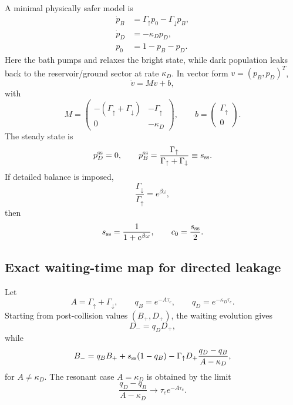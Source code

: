 \documentclass[11pt,a4paper]{article}
\begin{document}
A minimal physically safer model is
\begin{align}
\dot p_B&=\Gamma_\uparrow p_0-\Gamma_\downarrow p_B,\\
\dot p_D&=-\kappa_D p_D,\\
p_0&=1-p_B-p_D.
\end{align}
Here the bath pumps and relaxes the bright state, while dark population leaks back to the reservoir/ground sector at rate $\kappa_D$. In vector form $v=(p_B,p_D)^T$,
\begin{equation}
\dot v=Mv+b,
\end{equation}
with
\begin{equation}
M=\begin{pmatrix}
-(\Gamma_\uparrow+\Gamma_\downarrow)&-\Gamma_\uparrow\\
0&-\kappa_D
\end{pmatrix},
\qquad
b=\begin{pmatrix}\Gamma_\uparrow\\0\end{pmatrix}.
\end{equation}
The steady state is
\begin{equation}
p_D^{\rm ss}=0,
\qquad
p_B^{\rm ss}=\frac{\Gamma_\uparrow}{\Gamma_\uparrow+\Gamma_\downarrow}\equiv s_{\rm ss}.
\end{equation}
If detailed balance is imposed,
\begin{equation}
\frac{\Gamma_\downarrow}{\Gamma_\uparrow}=e^{\beta\omega},
\end{equation}
then
\begin{equation}
s_{\rm ss}=\frac{1}{1+e^{\beta\omega}},
\qquad
c_0=\frac{s_{\rm ss}}{2}.
\end{equation}

\subsection{Exact waiting-time map for directed leakage}

Let
\begin{equation}
A=\Gamma_\uparrow+\Gamma_\downarrow,
\qquad
q_B=e^{-A\tau_c},
\qquad
q_D=e^{-\kappa_D\tau_c}.
\end{equation}
Starting from post-collision values $(B_+,D_+)$, the waiting evolution gives
\begin{equation}
D_-=q_DD_+,
\end{equation}
while
\begin{equation}
B_-=q_B B_+ + s_{\rm ss}(1-q_B)
-\Gamma_\uparrow D_+\frac{q_D-q_B}{A-\kappa_D},
\end{equation}
for $A\ne \kappa_D$. The resonant case $A=\kappa_D$ is obtained by the limit
\begin{equation}
\frac{q_D-q_B}{A-\kappa_D}\longrightarrow \tau_c e^{-A\tau_c}.
\end{equation}
\end{document}
